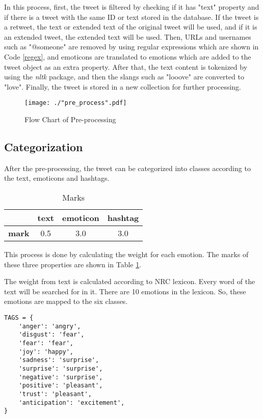 In this process, first, the tweet is filtered by checking if it has "text" property and if there is a tweet with the same ID or text stored in the database. If the tweet is a retweet, the text or extended text of the original tweet will be used, and if it is an extended tweet, the extended text will be used. Then, URLs and usernames such as "@someone" are removed by using regular expressions which are shown in Code \ref{regex}, and emoticons are translated to emotions which are added to the tweet object as an extra property. After that, the text content is tokenized by using the \textit{nltk} package, and then the slangs such as "looove" are converted to "love". Finally, the tweet is stored in a new collection for further processing.

\begin{figure}[ht]
    \centering
    \texttt{[image: ./"pre\_process".pdf]}
    \caption{Flow Chart of Pre-processing}
    \label{pre_processing}
\end{figure}

\subsection{Categorization}

After the pre-processing, the tweet can be categorized into classes according to the text, emoticons and hashtags.

\begin{table}[ht]
    \centering
    \begin{tabular}{|l|l|l|l|}
        \hline
         & text & emoticon & hashtag \\ \hline
        \textbf{mark} & \multicolumn{1}{c|}{0.5} & \multicolumn{1}{c|}{3.0} & \multicolumn{1}{c|}{3.0} \\ \hline
    \end{tabular}
    \caption{Marks}
    \label{marks}
\end{table}

This process is done by calculating the weight for each emotion. The marks of these three properties are shown in Table \ref{marks}.

The weight from text is calculated according to NRC lexicon. Every word of the text will be searched for in it. There are 10 emotions in the lexicon. So, these emotions are mapped to the six classes.

\begin{lstlisting}[caption={NRC Lexicon Map},captionpos=b,label={nrc}]
TAGS = {
    'anger': 'angry',
    'disgust': 'fear',
    'fear': 'fear',
    'joy': 'happy',
    'sadness': 'surprise',
    'surprise': 'surprise',
    'negative': 'surprise',
    'positive': 'pleasant',
    'trust': 'pleasant',
    'anticipation': 'excitement',
}
\end{lstlisting}

